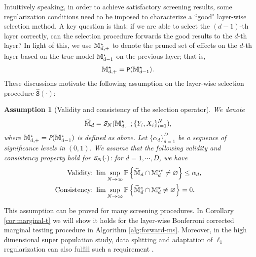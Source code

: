 \documentclass[12pt]{article}
\newtheorem{assumption}{Assumption}
\begin{document}
Intuitively speaking, in order to achieve satisfactory  screening results, some regularization conditions need to be imposed to characterize a ``good" layer-wise selection method. A key question is that: if we are able to select the $(d-1)$-th layer correctly, can the selection procedure forwards the good results to the $d$-th layer?  In light of this, we use ${{\mathbb{M}}}^\star_{d,+}$ to denote the pruned set of effects on the $d$-th layer based on the true model ${\mathbb{M}}_{d-1}^\star$ on the previous layer; that is,
\begin{align*}
    {{\mathbb{M}}}^\star_{d,+} = \texttt{P}({{\mathbb{M}}}^\star_{d-1}).
\end{align*}
These discussions motivate the following assumption on the layer-wise selection procedure $ \hat{\texttt{S}}(\cdot)$:
\begin{assumption}[Validity and consistency of the selection operator]%
We denote 
\begin{align*}
    \widetilde{{\mathbb{M}}}_{d} = \text{\em \texttt{S}}_N({\mathbb{M}}^{\star}_{d,+};\{Y_i,X_i\}^N_{i=1}),
\end{align*}
where ${\mathbb{M}}^{\star}_{d,+} = \text{\em \texttt{P}}({\mathbb{M}}^{\star}_{d-1})$ is defined as above. Let $\{\alpha_d\}_{d=1}^D$ be a sequence of significance levels in $(0,1)$. We assume that the following \emph{validity} and \emph{consistency} property hold for $\text{\em \texttt{S}}_N(\cdot)$: for $d = 1,\cdots, D$, we have
\begin{align}
    \text{Validity:}&~\lim\sup_{N\to\infty}\bbP\lt\{\tilde{\bbM}_{d}\cap\bbM^{\star c}_d\neq \varnothing\rt\}\le \alpha_d,  %
    \\
    \text{Consistency:}&~\lim\sup_{N\to\infty}\bbP\lt\{\tilde{\bbM}_{d}^c\cap\bbM^{\star}_d\neq \varnothing\rt\} = 0.  %
\end{align}
\end{assumption}

This assumption can be proved for many  screening procedures. In Corollary \ref{cor:marginal-t} we will show it holds for the layer-wise Bonferroni corrected marginal testing procedure in Algorithm \ref{alg:forward-ms}. Moreover, in the high dimensional super population study, data splitting and adaptation of $\ell_1$ regularization can also fulfill such a requirement \citep{wasserman2009high}.
\end{document}
